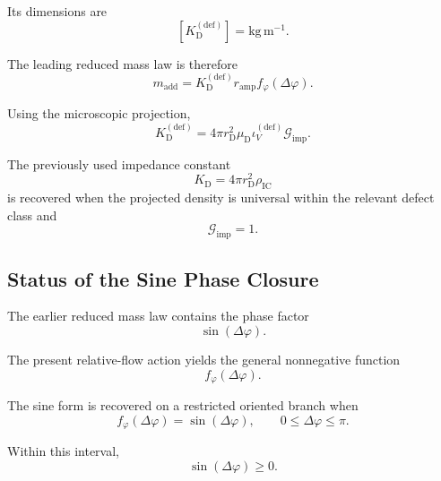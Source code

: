 Its dimensions are
\begin{equation}
    \left[ K_{\mathrm{D}}^{(\mathrm{def})} \right] = \mathrm{kg\,m^{-1}}.
\end{equation}

The leading reduced mass law is therefore
\begin{equation}
    \boxed{ m_{\mathrm{add}} = K_{\mathrm{D}}^{(\mathrm{def})} r_{\mathrm{amp}} f_{\varphi}(\Delta\varphi) }.
\end{equation}

Using the microscopic projection,
\begin{equation}
    \boxed{ K_{\mathrm{D}}^{(\mathrm{def})} = 4\pi r_{\mathrm{D}}^2 \mu_{\mathrm{D}} \iota_V^{(\mathrm{def})} \mathcal{G}_{\mathrm{imp}} }.
\end{equation}

The previously used impedance constant
\begin{equation}
    K_{\mathrm{D}} = 4\pi r_{\mathrm{D}}^2\rho_{\mathrm{IC}}
\end{equation}
is recovered when the projected density is universal within the relevant defect class and
\begin{equation}
    \mathcal{G}_{\mathrm{imp}} = 1.
\end{equation}

\subsection{Status of the Sine Phase Closure}

The earlier reduced mass law contains the phase factor
\begin{equation}
    \sin(\Delta\varphi).
\end{equation}

The present relative-flow action yields the general nonnegative function
\begin{equation}
    f_{\varphi}(\Delta\varphi).
\end{equation}

The sine form is recovered on a restricted oriented branch when
\begin{equation}
    \boxed{ f_{\varphi}(\Delta\varphi) = \sin(\Delta\varphi), \qquad 0 \leq \Delta\varphi \leq \pi }.
\end{equation}

Within this interval,
\begin{equation}
    \sin(\Delta\varphi) \geq 0.
\end{equation}

